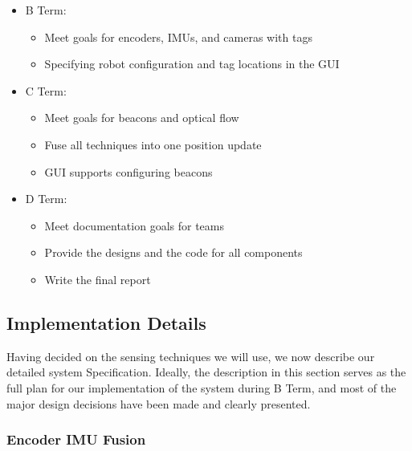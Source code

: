 \documentclass{article}
\begin{document}
    \begin{itemize}
      \item B Term:
      \begin{itemize}
        \item Meet goals for encoders, IMUs, and cameras with tags
        \item Specifying robot configuration and tag locations in the GUI
      \end{itemize}
      \item C Term:
      \begin{itemize}
        \item Meet goals for beacons and optical flow
        \item Fuse all techniques into one position update
        \item GUI supports configuring beacons
      \end{itemize}
      \item D Term:
      \begin{itemize}
        \item Meet documentation goals for teams
        \item Provide the designs and the code for all components
        \item Write the final report
      \end{itemize}
    \end{itemize}

  \subsection{Implementation Details}

    Having decided on the sensing techniques we will use, we now describe our detailed system Specification. Ideally, the description in this section serves as the full plan for our implementation of the system during B Term, and most of the major design decisions have been made and clearly presented.

    \subsubsection{Encoder IMU Fusion}
\end{document}
